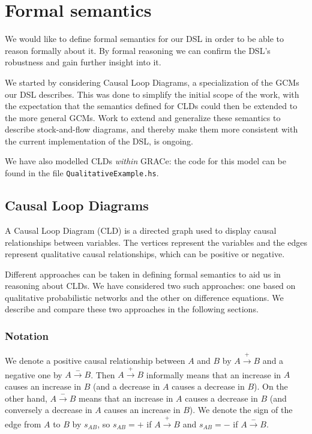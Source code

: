 \section{Formal semantics}
\label{sec:semantics}
We would like to define formal semantics for our DSL in order to be
able to reason formally about it.
%
By formal reasoning we can confirm the DSL's robustness and gain
further insight into it.

We started by considering Causal Loop Diagrams, a specialization of
the GCMs our DSL describes.
%
This was done to simplify the initial scope of the work, with the
expectation that the semantics defined for CLDs could then be extended
to the more general GCMs.
%
Work to extend and generalize these semantics to describe
stock-and-flow diagrams, and thereby make them more consistent with
the current implementation of the DSL, is ongoing.

We have also modelled CLDs \emph{within} GRACe: the code for this
model can be found in the file \verb|QualitativeExample.hs|.

\subsection{Causal Loop Diagrams}
%
A Causal Loop Diagram (CLD) is a directed graph used to display causal
relationships between variables.
%
The vertices represent the variables and the edges represent
qualitative causal relationships, which can be positive or negative.

Different approaches can be taken in defining formal semantics to aid
us in reasoning about CLDs.
%
We have considered two such approaches: one based on qualitative
probabilistic networks and the other on difference equations.
%
We describe and compare these two approaches in the following
sections.

\subsubsection{Notation}
We denote a positive causal relationship between $A$ and $B$ by
$A\xrightarrow{+} B$ and a negative one by $A \xrightarrow{-} B$.
%
Then $A \xrightarrow{+} B$ informally means that an increase in $A$
causes an increase in $B$ (and a decrease in $A$ causes a decrease in
$B$).
%
On the other hand, $A\xrightarrow{-} B$ means that an increase in $A$
causes a decrease in $B$ (and conversely a decrease in $A$ causes an
increase in $B$).
%
We denote the sign of the edge from $A$ to $B$ by $s_{AB}$, so
$s_{AB}= +$ if $A\xrightarrow{+} B$ and $s_{AB}=-$ if
$A\xrightarrow{-} B$.

